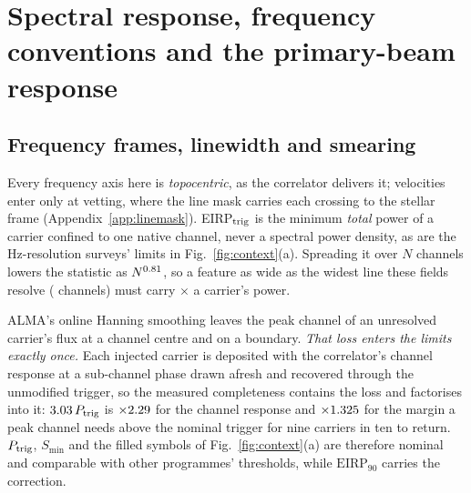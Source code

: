 \section{Spectral response, frequency conventions and the primary-beam
response}
\label{app:conventions}


\subsection{Frequency frames, linewidth and smearing}

Every frequency axis here is \emph{topocentric}, as the correlator delivers
it; velocities enter only at vetting, where the line mask carries each
crossing to the stellar frame (Appendix~\ref{app:linemask}). EIRP$_{\rm trig}$
is the minimum \emph{total} power of a carrier confined to one native channel,
never a spectral power density, as are the Hz-resolution surveys' limits in
Fig.~\ref{fig:context}(a). Spreading it over $N$ channels lowers the statistic as
$N^{0.81}$, so a feature as wide as the widest line these fields
resolve (\ScNBroadChan{} channels) must carry \ScNBroadRatio$\times$ a
carrier's power.

ALMA's online Hanning smoothing \citep{ALMAHandbook} leaves the peak channel
\HanBest{} of an unresolved carrier's flux at a channel centre and \HanWorst{}
on a boundary. \emph{That loss enters the limits exactly once.} Each injected
carrier is deposited with the correlator's channel response at a sub-channel
phase drawn afresh and recovered through the unmodified trigger, so the
measured completeness contains the loss and factorises into it:
$3.03\,P_{\rm trig}$ is $\times2.29$ for the channel response
and $\times1.325$ for the margin a peak channel needs above the
nominal trigger for nine carriers in ten to return. $P_{\rm trig}$, $S_{\min}$
and the filled symbols of Fig.~\ref{fig:context}(a) are therefore nominal and
comparable with other programmes' thresholds, while $\mathrm{EIRP}_{90}$
carries the correction.

